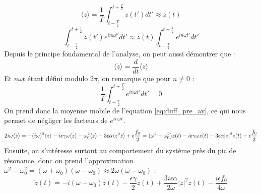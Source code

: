 \begin{equation}
    \langle z \rangle = \frac{1}{T}\int_{t-\frac{T}{2}}^{t+\frac{T}{2}}{z(t')}dt' \approx  z(t)
\end{equation}
\begin{equation}
    \int_{t-\frac{T}{2}}^{t+\frac{T}{2}}{z(t')e^{in\omega t'}}dt'  \approx z(t) \int_{t-\frac{T}{2}}^{t+\frac{T}{2}}{e^{in\omega t'}}dt'
\end{equation}
%
Depuis le principe fondamental de l'analyse, on peut aussi démontrer que :
%
\begin{equation}
    \langle \dot{z} \rangle = \frac{d}{dt} \langle z \rangle
\end{equation}
%
Et $n \omega t$ étant défini modulo $2\pi$, on remarque que pour $n \neq 0$ :
\begin{equation*}
    \frac{1}{T}\int_{t-\frac{T}{2}}^{t+\frac{T}{2}}{e^{in\omega t'}}dt' = 0
\end{equation*}
%
On prend donc la moyenne mobile de l'equation \eqref{eq:duff_pre_av}, 
ce qui nous permet de négliger les facteurs de $e^{i n\omega t}$.
\begin{dmath}
    2i\omega \langle \dot{z} \rangle = - (i\omega)^2 \langle z \rangle
    - i\epsilon\gamma\omega \langle z \rangle
    - \omega_0^2 \langle z \rangle 
    - 3 \epsilon \alpha \langle z^2 \bar{z} \rangle
    + \epsilon \frac{f_0}{2} \\
    = (\omega^2 - \omega_0^2)z(t) - i\epsilon\gamma\omega z(t) - 3\epsilon\alpha |z|^2 z(t) + \epsilon \frac{f_0}{2}
\end{dmath}
%
Ensuite, on s'intéresse surtout au comportement du système près du pic de résonance, 
donc on prend l'approximation $\omega^2 - \omega_0^2 = (\omega + \omega_0)(\omega - \omega_0) \approx 2\omega(\omega - \omega_0)$ :
%
\begin{dmath}
    \dot{z}(t) = -i(\omega - \omega_0)z(t)
    - \frac{\epsilon\gamma}{2} z(t) + \frac{3i\epsilon\alpha}{2\omega}|z|^2z(t) - \frac{i\epsilon f_0}{4\omega}
\end{dmath}
%
